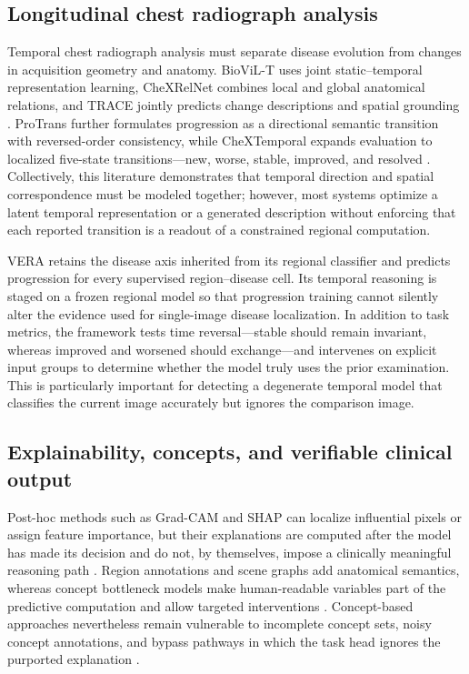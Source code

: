 \documentclass[preprint,12pt]{elsarticle}
\begin{document}
\subsection{Longitudinal chest radiograph analysis}

Temporal chest radiograph analysis must separate disease evolution from changes
in acquisition geometry and anatomy. BioViL-T uses joint static--temporal
representation learning, CheXRelNet combines local and global anatomical
relations, and TRACE jointly predicts change descriptions and spatial grounding
\cite{bannur2023biovilt,karwande2022chexrelnet,aranya2026trace}. ProTrans further
formulates progression as a directional semantic transition with reversed-order
consistency, while CheXTemporal expands evaluation to localized five-state
transitions---new, worse, stable, improved, and resolved
\cite{hu2026protrans,prakash2026chextemporal}. Collectively, this literature
demonstrates that temporal direction and spatial correspondence must be modeled
together; however, most systems optimize a latent temporal representation or a
generated description without enforcing that each reported transition is a
readout of a constrained regional computation.

VERA retains the disease axis inherited from its regional classifier and predicts
progression for every supervised region--disease cell. Its temporal reasoning is
staged on a frozen regional model so that progression training cannot silently
alter the evidence used for single-image disease localization. In addition to
task metrics, the framework tests time reversal---stable should remain invariant,
whereas improved and worsened should exchange---and intervenes on explicit input
groups to determine whether the model truly uses the prior examination. This is
particularly important for detecting a degenerate temporal model that classifies
the current image accurately but ignores the comparison image.

\subsection{Explainability, concepts, and verifiable clinical output}

Post-hoc methods such as Grad-CAM and SHAP can localize influential pixels or
assign feature importance, but their explanations are computed after the model
has made its decision and do not, by themselves, impose a clinically meaningful
reasoning path \cite{selvaraju2017gradcam,lundberg2017shap}. Region annotations
and scene graphs add anatomical semantics, whereas concept bottleneck models make
human-readable variables part of the predictive computation and allow targeted
interventions \cite{wu2021chestimagenome,koh2020cbm,shin2023intervention}.
Concept-based approaches nevertheless remain vulnerable to incomplete concept
sets, noisy concept annotations, and bypass pathways in which the task head
ignores the purported explanation \cite{shin2023intervention,wang2026conceptcomplement}.
\end{document}
